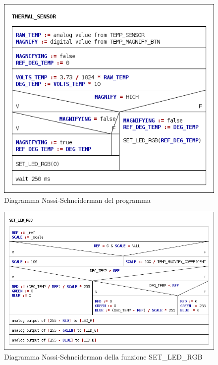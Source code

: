 \documentclass[a4paper]{article}
\begin{document}
	\begin{figure}[h!]
		\centering
		\includegraphics[width=\textwidth]{../structograms/THERMAL_SENSOR.png}
		\caption{Diagramma Nassi-Schneiderman del programma}
	\end{figure}
	
	\begin{figure}[h!]
		\centering
		\includegraphics[width=\textwidth]{../structograms/SET_LED_RGB.png}
		\caption{Diagramma Nassi-Schneiderman della funzione SET\_LED\_RGB}
	\end{figure}
	
	
	
\end{document}
